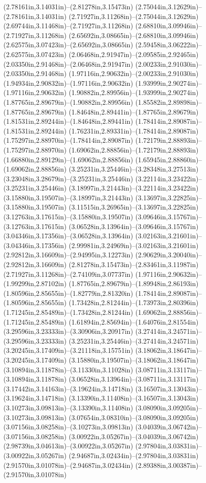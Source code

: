 (2.78161in,3.14031in)--(2.81278in,3.15473in) (2.75044in,3.12629in)--(2.78161in,3.14031in) (2.71927in,3.11268in)--(2.75044in,3.12629in) (2.69744in,3.11468in)--(2.71927in,3.11268in) (2.68810in,3.09946in)--(2.71927in,3.11268in) (2.65692in,3.08665in)--(2.68810in,3.09946in) (2.62575in,3.07423in)--(2.65692in,3.08665in) (2.59458in,3.06222in)--(2.62575in,3.07423in) (2.06468in,2.91947in)--(2.09585in,2.92465in) (2.03350in,2.91468in)--(2.06468in,2.91947in) (2.00233in,2.91030in)--(2.03350in,2.91468in) (1.97116in,2.90632in)--(2.00233in,2.91030in) (1.94934in,2.90832in)--(1.97116in,2.90632in) (1.93999in,2.90274in)--(1.97116in,2.90632in) (1.90882in,2.89956in)--(1.93999in,2.90274in) (1.87765in,2.89679in)--(1.90882in,2.89956in) (1.85582in,2.89898in)--(1.87765in,2.89679in) (1.84648in,2.89441in)--(1.87765in,2.89679in) (1.81531in,2.89244in)--(1.84648in,2.89441in) (1.78414in,2.89087in)--(1.81531in,2.89244in) (1.76231in,2.89331in)--(1.78414in,2.89087in) (1.75297in,2.88970in)--(1.78414in,2.89087in) (1.72179in,2.88893in)--(1.75297in,2.88970in) (1.69062in,2.88856in)--(1.72179in,2.88893in) (1.66880in,2.89129in)--(1.69062in,2.88856in) (1.65945in,2.88860in)--(1.69062in,2.88856in) (3.25231in,3.25446in)--(3.28348in,3.27513in) (3.23048in,3.28679in)--(3.25231in,3.25446in) (3.22114in,3.23422in)--(3.25231in,3.25446in) (3.18997in,3.21443in)--(3.22114in,3.23422in) (3.15880in,3.19507in)--(3.18997in,3.21443in) (3.13697in,3.22825in)--(3.15880in,3.19507in) (3.11515in,3.26965in)--(3.13697in,3.22825in) (3.12763in,3.17615in)--(3.15880in,3.19507in) (3.09646in,3.15767in)--(3.12763in,3.17615in) (3.06528in,3.13964in)--(3.09646in,3.15767in) (3.04346in,3.17356in)--(3.06528in,3.13964in) (3.02163in,3.21601in)--(3.04346in,3.17356in) (2.99981in,3.24969in)--(3.02163in,3.21601in) (2.92812in,3.16609in)--(2.94995in,3.12273in) (2.90629in,3.20040in)--(2.92812in,3.16609in) (2.81278in,3.15473in)--(2.83461in,3.11987in) (2.71927in,3.11268in)--(2.74109in,3.07737in) (1.97116in,2.90632in)--(1.99299in,2.87102in) (1.87765in,2.89679in)--(1.89948in,2.86193in) (1.80596in,2.85655in)--(1.82779in,2.81320in) (1.78414in,2.89087in)--(1.80596in,2.85655in) (1.73428in,2.81244in)--(1.73973in,2.80396in) (1.71245in,2.85489in)--(1.73428in,2.81244in) (1.69062in,2.88856in)--(1.71245in,2.85489in) (1.61894in,2.85694in)--(1.64076in,2.81554in) (3.29596in,3.23333in)--(3.30906in,3.20917in) (3.27414in,3.24571in)--(3.29596in,3.23333in) (3.25231in,3.25446in)--(3.27414in,3.24571in) (3.20245in,3.17409in)--(3.21118in,3.15751in) (3.18062in,3.18647in)--(3.20245in,3.17409in) (3.15880in,3.19507in)--(3.18062in,3.18647in) (3.10894in,3.11878in)--(3.11330in,3.11028in) (3.08711in,3.13117in)--(3.10894in,3.11878in) (3.06528in,3.13964in)--(3.08711in,3.13117in) (3.17442in,3.14163in)--(3.19624in,3.14718in) (3.16507in,3.13043in)--(3.19624in,3.14718in) (3.13390in,3.11408in)--(3.16507in,3.13043in) (3.10273in,3.09813in)--(3.13390in,3.11408in) (3.08090in,3.09205in)--(3.10273in,3.09813in) (3.07654in,3.08310in)--(3.08090in,3.09205in) (3.07156in,3.08258in)--(3.10273in,3.09813in) (3.04039in,3.06742in)--(3.07156in,3.08258in) (3.00922in,3.05267in)--(3.04039in,3.06742in) (2.98739in,3.04613in)--(3.00922in,3.05267in) (2.97804in,3.03831in)--(3.00922in,3.05267in) (2.94687in,3.02434in)--(2.97804in,3.03831in) (2.91570in,3.01078in)--(2.94687in,3.02434in) (2.89388in,3.00387in)--(2.91570in,3.01078in) 